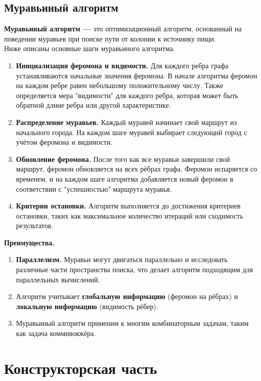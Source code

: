 \documentclass[12pt, a4paper]{article}
\begin{document}
\subsection{Муравьиный алгоритм}
\textbf{Муравьиный алгоритм ---} это оптимизационный алгоритм, 
основанный на поведении муравьев при поиске пути от колонии к 
источнику пищи.\\
Ниже описаны основные шаги муравьиного алгоритма.
\begin{enumerate}
	\item \textbf{Инициализация феромона и видимости.} Для каждого 
	ребра графа устанавливаются начальные значения феромона. В 
	начале алгоритма феромон на каждом ребре равен небольшому 
	положительному числу. Также определяется мера "видимости" для 
	каждого ребра, которая может быть обратной длине ребра или 
	другой характеристике.
	\item \textbf{Распределение муравьев.} Каждый муравей начинает 
	свой маршрут из начального города. На каждом шаге муравей 
	выбирает следующий город с учётом феромона и видимости.
	\item \textbf{Обновление феромона.} После того как все муравьи 
	завершили свой маршрут, феромон обновляется на всех рёбрах 
	графа. Феромон испаряется со временем, и на каждом шаге 
	алгоритма добавляется новый феромон в соответствии с 
	"успешностью" маршрута муравья.
	\item \textbf{Критерии остановки.} Алгоритм выполняется до 
	достижения критериев остановки, таких как максимальное 
	количество итераций или сходимость результатов.
\end{enumerate}
\textbf{Преимущества.}
\begin{enumerate}
	\item \textbf{Параллелизм.} Муравьи могут двигаться параллельно 
	и исследовать различные части пространства поиска, что делает 
	алгоритм подходящим для параллельных вычислений.
	\item Алгоритм учитывает \textbf{глобальную информацию} (феромон 
	на рёбрах) и \textbf{локальную информацию} (видимость рёбер).
	\item Муравьиный алгоритм применим к многим комбинаторным 
	задачам, таким как задача коммивояжёра.
\end{enumerate}
\newpage
\section{Конструкторская часть}
\end{document}
